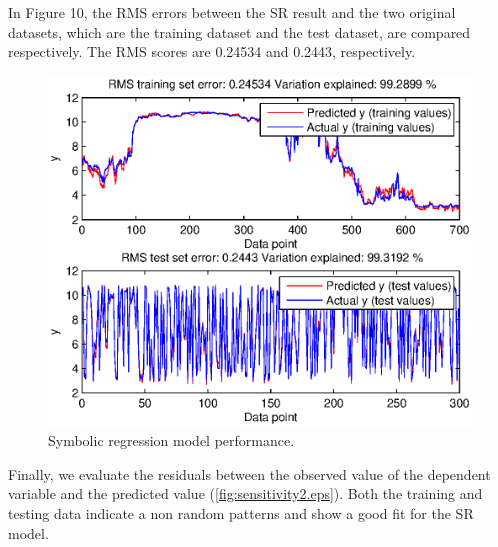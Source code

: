 \documentclass[10pt,journal,compsoc]{IEEEtran}
\begin{document}
  
  In Figure 10, the RMS errors between the SR result and the two original datasets,  which are the training dataset and the test dataset, are compared respectively.
  The RMS scores are 0.24534 and 0.2443, respectively. 
  
       \begin{figure}[tb]
       	\centering
       	\includegraphics[width=\linewidth,clip]{sensitivity.eps}
       	\vspace{-2em}
       	\caption{Symbolic regression model performance.}
       	\label{fig:sensitivity.eps}
       \end{figure}
       	

Finally, we evaluate the residuals between the observed value of the dependent variable and the predicted value (\autoref{fig:sensitivity2.eps}). Both the training and testing data indicate a non random patterns and show a good fit for the SR model.
\end{document}
